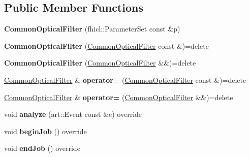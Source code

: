\subsection*{Public Member Functions}
\begin{DoxyCompactItemize}
\item 
{\bfseries Common\+Optical\+Filter} (fhicl\+::\+Parameter\+Set const \&p)\hypertarget{classCommonOpticalFilter_a81f6d22db0a88f0d6c484130b689ceae}{}\label{classCommonOpticalFilter_a81f6d22db0a88f0d6c484130b689ceae}

\item 
{\bfseries Common\+Optical\+Filter} (\hyperlink{classCommonOpticalFilter}{Common\+Optical\+Filter} const \&)=delete\hypertarget{classCommonOpticalFilter_a45ceeadd04ac3623d214753aa21aa0f1}{}\label{classCommonOpticalFilter_a45ceeadd04ac3623d214753aa21aa0f1}

\item 
{\bfseries Common\+Optical\+Filter} (\hyperlink{classCommonOpticalFilter}{Common\+Optical\+Filter} \&\&)=delete\hypertarget{classCommonOpticalFilter_af39ba3d2916d1dab8459c5bc2fda8963}{}\label{classCommonOpticalFilter_af39ba3d2916d1dab8459c5bc2fda8963}

\item 
\hyperlink{classCommonOpticalFilter}{Common\+Optical\+Filter} \& {\bfseries operator=} (\hyperlink{classCommonOpticalFilter}{Common\+Optical\+Filter} const \&)=delete\hypertarget{classCommonOpticalFilter_a68bfc736eeb9dafa17ea51d7f8d5191a}{}\label{classCommonOpticalFilter_a68bfc736eeb9dafa17ea51d7f8d5191a}

\item 
\hyperlink{classCommonOpticalFilter}{Common\+Optical\+Filter} \& {\bfseries operator=} (\hyperlink{classCommonOpticalFilter}{Common\+Optical\+Filter} \&\&)=delete\hypertarget{classCommonOpticalFilter_aadd7bd59c546371f0d2c1b06fc187d7b}{}\label{classCommonOpticalFilter_aadd7bd59c546371f0d2c1b06fc187d7b}

\item 
void {\bfseries analyze} (art\+::\+Event const \&e) override\hypertarget{classCommonOpticalFilter_a4e474389d55dc9d143a96636a7222880}{}\label{classCommonOpticalFilter_a4e474389d55dc9d143a96636a7222880}

\item 
void {\bfseries begin\+Job} () override\hypertarget{classCommonOpticalFilter_ae1d42b367bfb18eb5a7ac9714a3c534d}{}\label{classCommonOpticalFilter_ae1d42b367bfb18eb5a7ac9714a3c534d}

\item 
void {\bfseries end\+Job} () override\hypertarget{classCommonOpticalFilter_ae29e456913b0021782b5006404b30a3f}{}\label{classCommonOpticalFilter_ae29e456913b0021782b5006404b30a3f}

\end{DoxyCompactItemize}

